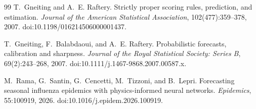 \documentclass[12pt,a4paper]{article}
\theoremstyle{definition}
\theoremstyle{remark}
\begin{document}
\begin{thebibliography}{99}
T.~Gneiting and A.~E. Raftery.
\newblock Strictly proper scoring rules, prediction, and estimation.
\newblock \emph{Journal of the American Statistical Association}, 102(477):359--378, 2007.
\newblock doi:10.1198/016214506000001437.

T.~Gneiting, F.~Balabdaoui, and A.~E. Raftery.
\newblock Probabilistic forecasts, calibration and sharpness.
\newblock \emph{Journal of the Royal Statistical Society: Series B}, 69(2):243--268, 2007.
\newblock doi:10.1111/j.1467-9868.2007.00587.x.


M.~Rama, G.~Santin, G.~Cencetti, M.~Tizzoni, and B.~Lepri.
\newblock Forecasting seasonal influenza epidemics with physics-informed neural networks.
\newblock \emph{Epidemics}, 55:100919, 2026.
\newblock doi:10.1016/j.epidem.2026.100919.

\end{thebibliography}
\end{document}
